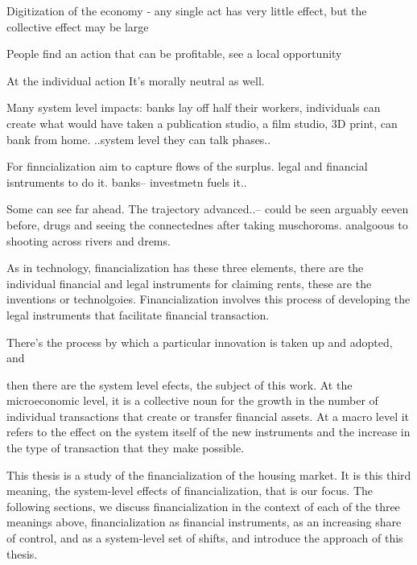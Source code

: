Digitization of the economy - any single act has very little effect, but the collective effect may be large

People find an action that can be profitable, see a local opportunity

At the individual action
It's morally neutral as well.

Many system level impacts:
banks lay off half their workers, individuals can create what would have taken a publication studio, a film studio, 3D print, can bank from home. ..system level they can talk phases..



For finncialization
aim to capture flows of the surplus.
legal and financial isntruments to do it. 
banks-- investmetn fuels it..

Some can see far ahead.
The trajectory advanced..-- could be seen
arguably eeven before, drugs and seeing the connectednes after taking muschoroms. analgoous to shooting across rivers and drems. 


As in technology, financialization has these three elements, there are the individual financial and legal instruments for claiming rents, these are the inventions or technolgoies.
Financialization involves this process of developing the legal instruments that facilitate financial transaction.

There's the process by which a particular innovation is taken up and adopted, and 


then there are the system level efects, the subject of this work.
% 
 At the microeconomic level, it is a collective noun for the growth in the number of individual transactions that create or transfer financial assets. At a macro level it refers to the effect on the system itself of the new instruments and the increase in the type of transaction that they make possible.

This thesis is a study of the financialization of the housing market. It is this third meaning, the system-level effects of financialization, that is our focus. The following sections, we discuss financialization in the context of each of the three meanings above, financialization as financial instruments, as an increasing share of control, and as a system-level set of shifts, and introduce the approach of this thesis. 


